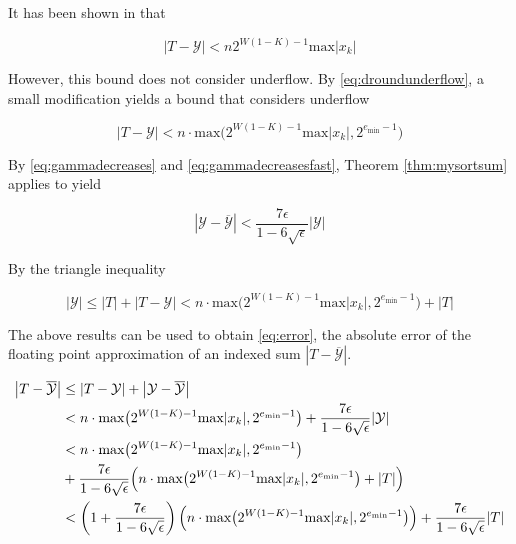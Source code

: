 \documentclass[12pt]{article}
\providecommand{\min}{\ensuremath{\text{min}}}
\providecommand{\max}{\ensuremath{\text{max}}}
\theoremstyle{definition}
\numberwithin{equation}{section}
\numberwithin{figure}{section}
\begin{document}
    It has been shown in \cite{repsum} that

    \begin{equation}
      \label{eq:repboundnaive}
      |T - \mathcal{Y}| < n  2^{W  (1 - K) - 1}\max|x_k|
    \end{equation}

    However, this bound does not consider underflow. By  \eqref{eq:droundunderflow}, a small modification yields a bound that considers underflow

    \begin{equation}
      \label{eq:repbound}
      |T - \mathcal{Y}| < n \cdot \max\bigl(2^{W  (1 - K) - 1} \max|x_k|, 2^{e_{\min} - 1}\bigr)
    \end{equation}

    By  \eqref{eq:gammadecreases} and \eqref{eq:gammadecreasesfast}, Theorem \ref{thm:mysortsum} applies to yield

    \begin{equation*}
      \left|\mathcal{Y} - \overline{\mathcal{Y}}\right| < \frac{7\epsilon}{1 - 6\sqrt\epsilon}|\mathcal{Y}|
    \end{equation*}

    By the triangle inequality

    \begin{equation*}
      |\mathcal{Y}| \leq |T| + |T - \mathcal{Y}| < n \cdot \max\bigl(2^{W  (1 - K) - 1}  \max|x_k|, 2^{e_{\min} - 1}\bigr) + |T|
    \end{equation*}

    The above results can be used to obtain  \eqref{eq:error}, the absolute error of the floating point approximation of an indexed sum $|T - \overline{\mathcal{Y}}|$.

    \begin{align}
      \left|T - \overline{\mathcal{Y}}\right| &\leq |T - \mathcal{Y}| + \left|\mathcal{Y} - \overline{\mathcal{Y}}\right| \nonumber \\
      &< n \cdot \max\bigl(2^{W  (1 - K) - 1}  \max|x_k|, 2^{e_{\min} - 1}\bigr) + \frac{7\epsilon}{1 - 6\sqrt\epsilon} |\mathcal{Y}| \nonumber \\
      &< n \cdot \max\bigl(2^{W  (1 - K) - 1}  \max|x_k|, 2^{e_{\min} - 1}\bigr) \nonumber \\
      &+ \frac{7\epsilon}{1 - 6\sqrt\epsilon} \Bigl(n \cdot \max\bigl(2^{W  (1 - K) - 1}  \max|x_k|, 2^{e_{\min} - 1}\bigr) + |T|\Bigr) \nonumber \\
      &< \left(1 + \frac{7\epsilon}{1 - 6\sqrt\epsilon}\right) \Bigl(n \cdot \max\bigl(2^{W (1 - K) - 1} \max|x_k|, 2^{e_{\min} - 1}\bigr)\Bigr) + \frac{7\epsilon}{1 - 6\sqrt\epsilon} |T|
      \label{eq:error}
    \end{align}
\end{document}
